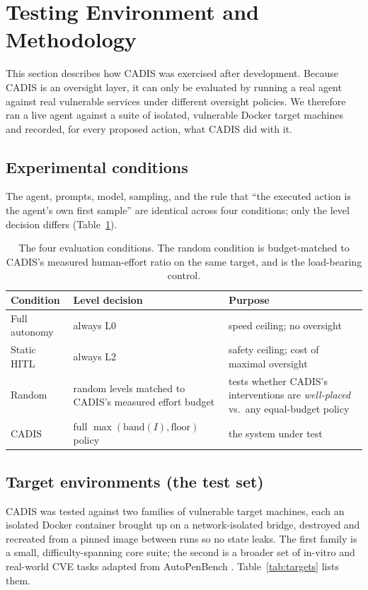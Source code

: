 \documentclass[11pt]{article}
\begin{document}
\section{Testing Environment and Methodology}\label{sec:test}
This section describes how CADIS was exercised after development. Because CADIS is an oversight layer,
it can only be evaluated by running a real agent against real vulnerable services under different
oversight policies. We therefore ran a live agent against a suite of isolated, vulnerable Docker target
machines and recorded, for every proposed action, what CADIS did with it.

\subsection{Experimental conditions}
The agent, prompts, model, sampling, and the rule that ``the executed action is the agent's own first
sample'' are identical across four conditions; only the level decision differs
(Table~\ref{tab:conditions}).

\begin{table}[t]
\centering
\begin{tabular}{ll p{7.4cm}}
\toprule
Condition & Level decision & Purpose \\
\midrule
Full autonomy & always L0 & speed ceiling; no oversight \\
Static HITL & always L2 & safety ceiling; cost of maximal oversight \\
Random & random levels matched to CADIS's measured effort budget & tests whether CADIS's interventions are \emph{well-placed} vs.\ any equal-budget policy \\
CADIS & full $\max(\mathrm{band}(I),\mathrm{floor})$ policy & the system under test \\
\bottomrule
\end{tabular}
\caption{The four evaluation conditions. The random condition is budget-matched to CADIS's measured
human-effort ratio on the same target, and is the load-bearing control.}
\label{tab:conditions}
\end{table}

\subsection{Target environments (the test set)}
CADIS was tested against two families of vulnerable target machines, each an isolated Docker container
brought up on a network-isolated bridge, destroyed and recreated from a pinned image between runs so no
state leaks. The first family is a small, difficulty-spanning core suite; the second is a broader set of
in-vitro and real-world CVE tasks adapted from AutoPenBench \citep{gioacchini2024autopenbench}.
Table~\ref{tab:targets} lists them.
\end{document}
